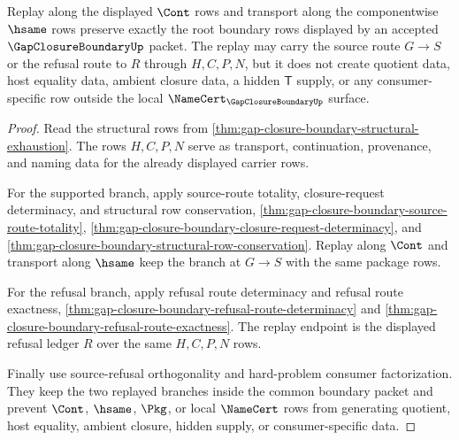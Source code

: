 \begin{theorem}
\label{thm:gap-closure-boundary-root-namecert-replay}
Replay along the displayed $\Cont$ rows and transport along the componentwise $\hsame$ rows preserve exactly the root boundary rows displayed by an accepted $\GapClosureBoundaryUp$ packet. The replay may carry the source route $G \longrightarrow S$ or the refusal route to $R$ through $H,C,P,N$, but it does not create quotient data, host equality data, ambient closure data, a hidden $\mathsf{T}$ supply, or any consumer-specific row outside the local $\NameCert_{\GapClosureBoundaryUp}$ surface.
\end{theorem}
\begin{proof}
Read the structural rows from \autoref{thm:gap-closure-boundary-structural-exhaustion}. The rows $H,C,P,N$ serve as transport, continuation, provenance, and naming data for the already displayed carrier rows.

For the supported branch, apply source-route totality, closure-request determinacy, and structural row conservation, \autoref{thm:gap-closure-boundary-source-route-totality}, \autoref{thm:gap-closure-boundary-closure-request-determinacy}, and \autoref{thm:gap-closure-boundary-structural-row-conservation}. Replay along $\Cont$ and transport along $\hsame$ keep the branch at $G \longrightarrow S$ with the same package rows.

For the refusal branch, apply refusal route determinacy and refusal route exactness, \autoref{thm:gap-closure-boundary-refusal-route-determinacy} and \autoref{thm:gap-closure-boundary-refusal-route-exactness}. The replay endpoint is the displayed refusal ledger $R$ over the same $H,C,P,N$ rows.

Finally use source-refusal orthogonality and hard-problem consumer factorization. They keep the two replayed branches inside the common boundary packet and prevent $\Cont$, $\hsame$, $\Pkg$, or local $\NameCert$ rows from generating quotient, host equality, ambient closure, hidden supply, or consumer-specific data.
\end{proof}
